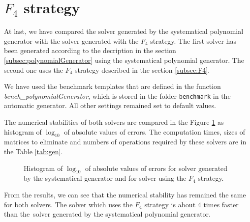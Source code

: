 \section{$F_4$ strategy}
\label{exp:gen}
At last, we have compared the solver generated by the systematical polynomial generator with the solver generated with the $F_4$ strategy. The first solver has been generated according to the decription in the section \ref{subsec:polynomialGenerator} using the systematical polynomial generator. The second one uses the $F_4$ strategy described in the section \ref{subsec:F4}.

We have used the benchmark templates that are defined in the function \textit{bench\_poly\-nomialGenerator}, which is stored in the folder \texttt{benchmark} in the automatic generator. All other settings remained set to default values.

The numerical stabilities of both solvers are compared in the Figure \ref{graph:gen} as histogram of $\log_{10}$ of absolute values of errors. The computation times, sizes of matrices to eliminate and numbers of operations required by these solvers are in the Table \ref{tab:gen}.

\begin{figure}[ht]
  \centering
  \resizebox{0.95\textwidth}{!}{}
  \caption{Histogram of $\log_{10}$ of absolute values of errors for solver generated by the systematical generator and for solver using the $F_4$ strategy.}
  \label{graph:gen}
\end{figure}

From the results, we can see that the numerical stability has remained the same for both solvers. The solver which uses the $F_4$ strategy is about 4 times faster than the~solver generated by the systematical polynomial generator.

